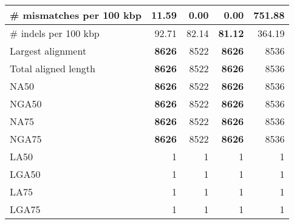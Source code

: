 \documentclass[12pt,a4paper]{article}
\begin{document}
\begin{table}[ht]
\begin{center}
\begin{tabular}{|l*{4}{|r}|}
\# mismatches per 100 kbp & 11.59 & {\bf 0.00} & {\bf 0.00} & 751.88 \\ \hline
\# indels per 100 kbp & 92.71 & 82.14 & {\bf 81.12} & 364.19 \\ \hline
Largest alignment & {\bf 8626} & 8522 & {\bf 8626} & 8536 \\ \hline
Total aligned length & {\bf 8626} & 8522 & {\bf 8626} & 8536 \\ \hline
NA50 & {\bf 8626} & 8522 & {\bf 8626} & 8536 \\ \hline
NGA50 & {\bf 8626} & 8522 & {\bf 8626} & 8536 \\ \hline
NA75 & {\bf 8626} & 8522 & {\bf 8626} & 8536 \\ \hline
NGA75 & {\bf 8626} & 8522 & {\bf 8626} & 8536 \\ \hline
LA50 & 1 & 1 & 1 & 1 \\ \hline
LGA50 & 1 & 1 & 1 & 1 \\ \hline
LA75 & 1 & 1 & 1 & 1 \\ \hline
LGA75 & 1 & 1 & 1 & 1 \\ \hline
\end{tabular}
\end{center}
\end{table}
\end{document}

